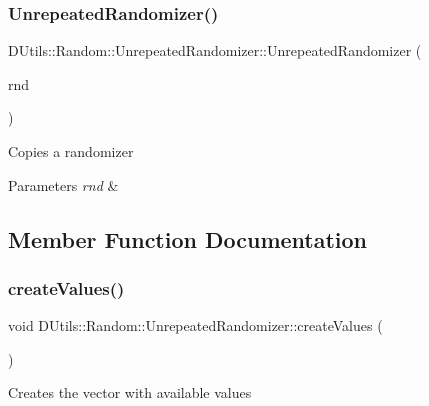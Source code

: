 \subsubsection{\texorpdfstring{Unrepeated\+Randomizer()}{UnrepeatedRandomizer()}\hspace{0.1cm}{\footnotesize\ttfamily [2/2]}}
{\footnotesize\ttfamily D\+Utils\+::\+Random\+::\+Unrepeated\+Randomizer\+::\+Unrepeated\+Randomizer (\begin{DoxyParamCaption}\item[{const \mbox{\hyperlink{class_d_utils_1_1_random_1_1_unrepeated_randomizer}{Unrepeated\+Randomizer}} \&}]{rnd }\end{DoxyParamCaption})}

Copies a randomizer 
\begin{DoxyParams}{Parameters}
{\em rnd} & \\
\hline
\end{DoxyParams}


\subsection{Member Function Documentation}
\mbox{\label{class_d_utils_1_1_random_1_1_unrepeated_randomizer_a583497053acec6991b9a872f924e8ccb}} 
\subsubsection{\texorpdfstring{create\+Values()}{createValues()}}
{\footnotesize\ttfamily void D\+Utils\+::\+Random\+::\+Unrepeated\+Randomizer\+::create\+Values (\begin{DoxyParamCaption}{ }\end{DoxyParamCaption})\hspace{0.3cm}{\ttfamily [protected]}}

Creates the vector with available values \mbox{\label{class_d_utils_1_1_random_1_1_unrepeated_randomizer_a4f93a3ab99e3e801d0c1d2599917a37a}} 
